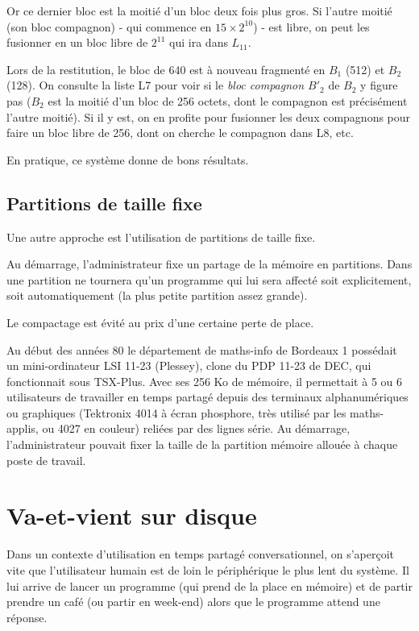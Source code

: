 \begin{multicols}{2}
Or ce dernier bloc est la moitié d'un bloc deux fois plus gros. Si
l'autre moitié (son bloc compagnon) - qui commence en $15 \times
2^{10}$) - est libre, on peut les fusionner en un bloc libre de
$2^{11}$ qui ira dans $L_{11}$.


Lors de la restitution, le bloc de 640 est à nouveau fragmenté en
$B_1$ (512) et $B_2$ (128). On consulte la liste L7 pour voir si le
{\em bloc compagnon $B'_2$} de $B_2$ y figure pas ($B_2$ est la moitié
d'un bloc de 256 octets, dont le compagnon est précisément l'autre
moitié).  Si il y est, on en profite pour fusionner les deux
compagnons pour faire un bloc libre de 256, dont on cherche le
compagnon dans L8, etc.

En pratique, ce système donne de bons résultats. 


\subsection{Partitions de taille fixe}

Une autre approche est l'utilisation de partitions de taille fixe.

Au démarrage, l'administrateur fixe un partage de la mémoire en
partitions. Dans une partition ne tournera qu'un programme qui lui
sera affecté soit explicitement, soit automatiquement (la plus petite
partition assez grande).

Le compactage est évité au prix d'une certaine perte de place.

Au début des années 80 le département de maths-info de Bordeaux 1
possédait un mini-ordinateur LSI 11-23 (Plessey), clone du PDP 11-23
de DEC, qui fonctionnait sous TSX-Plus. Avec ses 256 Ko de mémoire, il
permettait à 5 ou 6  utilisateurs de travailler en temps partagé
 depuis des
terminaux alphanumériques ou graphiques (Tektronix 4014 à écran
phosphore, très utilisé par les maths-applis, ou 4027 en couleur)
reliées par des lignes série.  Au démarrage, l'administrateur pouvait
fixer la taille de la partition mémoire allouée à chaque poste de
travail.


\section{Va-et-vient sur disque}

Dans un contexte d'utilisation en temps partagé conversationnel, on
s'aperçoit vite que l'utilisateur humain est de loin le périphérique
le plus lent du système.  Il lui arrive de lancer un programme (qui
prend de la place en mémoire) et de partir prendre un café (ou partir
en week-end) alors que le programme attend une réponse.


\end{multicols}
